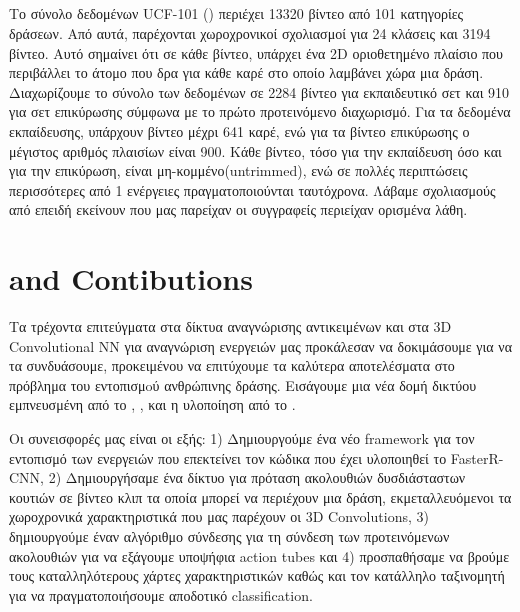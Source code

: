 \subsection{}
Το σύνολο δεδομένων \en UCF-101 (\cite{soomro2012ucf101}) \gr περιέχει 13320 βίντεο από 101 κατηγορίες δράσεων.
Από αυτά, παρέχονται χωροχρονικοί  σχολιασμοί για 24 κλάσεις  και 3194 βίντεο. Αυτό σημαίνει ότι σε κάθε βίντεο, υπάρχει ένα \en 2D \gr οριοθετημένο πλαίσιο που περιβάλλει
το άτομο που δρα για κάθε καρέ στο οποίο λαμβάνει χώρα μια δράση.
Διαχωρίζουμε το σύνολο των δεδομένων  σε 2284 βίντεο για εκπαιδευτικό σετ και 910 για σετ επικύρωσης σύμφωνα με το
πρώτο προτεινόμενο διαχωρισμό. Για τα δεδομένα εκπαίδευσης, υπάρχουν βίντεο μέχρι 641 καρέ, ενώ για τα βίντεο επικύρωσης ο μέγιστος αριθμός πλαισίων είναι 900.
Κάθε βίντεο, τόσο για την εκπαίδευση όσο και για την επικύρωση, είναι μη-κομμένο(\en untrimmed\gr), ενώ σε πολλές περιπτώσεις  περισσότερες από 1 ενέργειες πραγματοποιούνται ταυτόχρονα.
Λάβαμε σχολιασμούς από \en \cite{singh2016online} \gr επειδή εκείνουν που μας παρείχαν οι συγγραφείς περιείχαν ορισμένα λάθη.

\section{\enMotivation and Contibutions\gr}
Τα τρέχοντα επιτεύγματα στα δίκτυα αναγνώρισης αντικειμένων και στα \en 3D Convolutional NN για  αναγνώριση ενεργειών μας προκάλεσαν να δοκιμάσουμε
για να τα συνδυάσουμε, προκειμένου να επιτύχουμε τα καλύτερα αποτελέσματα στο πρόβλημα του εντοπισμoύ ανθρώπινης δράσης. Εισάγουμε μια νέα δομή δικτύου εμπνευσμένη από το
\cite{DBLP:journals/corr/HouCS17}, \cite{DBLP:journals/corr/abs-1712-09184}, \cite{Ren:2015:FRT:2969239.2969250} και η υλοποίηση από το  \cite{jjfaster2rcnn}.

Οι συνεισφορές μας είναι οι εξής: 1) Δημιουργούμε ένα νέο \en framework \gr για τον εντοπισμό των ενεργειών που επεκτείνει τον κώδικα που έχει υλοποιηθεί το \en FasterR-CNN,
2) Δημιουργήσαμε ένα δίκτυο για  πρόταση ακολουθιών δυσδιάσταστων κουτιών σε βίντεο κλιπ τα οποία μπορεί να περιέχουν μια δράση, εκμεταλλευόμενοι 
τα χωροχρονικά χαρακτηριστικά που μας παρέχουν οι \en 3D Convolutions\gr, 3) δημιουργούμε έναν αλγόριθμο σύνδεσης για τη σύνδεση των προτεινόμενων ακολουθιών
για να εξάγουμε υποψήφια \en action tubes \gr και 4) προσπαθήσαμε να βρούμε τους καταλληλότερους χάρτες χαρακτηριστικών καθώς και τον κατάλληλο ταξινομητή για να
πραγματοποιήσουμε αποδοτικό \en classification\gr.

